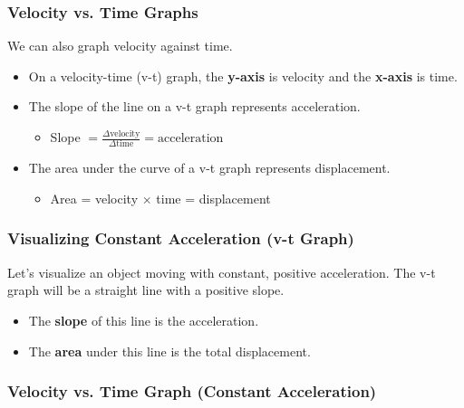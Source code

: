 \documentclass{beamer}
\begin{document}
\begin{frame}
\frametitle{Velocity vs. Time Graphs}
We can also graph velocity against time.
\pause
\begin{itemize}
    \item On a velocity-time (v-t) graph, the \textbf{y-axis} is velocity and the \textbf{x-axis} is time.
    \pause
    \item The \alert{slope} of the line on a v-t graph represents \alert{acceleration}.
    \pause
    \begin{itemize}
        \item Slope $= \frac{\Delta \text{velocity}}{\Delta \text{time}} = \text{acceleration}$
    \end{itemize}
    \pause
    \item The \alert{area under the curve} of a v-t graph represents \alert{displacement}.
    \pause
    \begin{itemize}
        \item Area = velocity $\times$ time = displacement
    \end{itemize}
\end{itemize}
\end{frame}

\begin{frame}
\frametitle{Visualizing Constant Acceleration (v-t Graph)}
Let's visualize an object moving with constant, positive acceleration. The v-t graph will be a straight line with a positive slope.
\begin{itemize}
    \item The \textbf{slope} of this line is the acceleration.
    \item The \textbf{area} under this line is the total displacement.
\end{itemize}
\end{frame}

\begin{frame}
\frametitle{Velocity vs. Time Graph (Constant Acceleration)}
\begin{figure}
\end{figure}
\end{frame}
\end{document}
